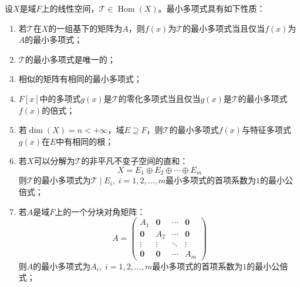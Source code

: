 \begin{property}\label{prop:MinimalPolynomial}
	设$X$是域$F$上的线性空间，$\mathcal{T}\in\operatorname{Hom}(X)$。最小多项式具有如下性质：
	\begin{enumerate}
		\item 若$\mathcal{T}$在$X$的一组基下的矩阵为$A$，则$f(x)$为$\mathcal{T}$的最小多项式当且仅当$f(x)$为$A$的最小多项式；
		\item $\mathcal{T}$的最小多项式是唯一的；
		\item 相似的矩阵有相同的最小多项式；
		\item $F[x]$中的多项式$g(x)$是$\mathcal{T}$的零化多项式当且仅当$g(x)$是$\mathcal{T}$的最小多项式$f(x)$的倍式；
		\item 若$\dim(X)=n<+\infty$，域$E\supseteq F$，则$\mathcal{T}$的最小多项式$f(x)$与特征多项式$g(x)$在$E$中有相同的根；
		\item 若$X$可以分解为$\mathcal{T}$的非平凡不变子空间的直和：
		\begin{equation*}
			X=E_1\oplus E_2\oplus\cdots\oplus E_m
		\end{equation*}
		则$\mathcal{T}$的最小多项式为$\mathcal{T}\mid E_i,\;i=1,2,\dots,m$最小多项式的首项系数为$1$的最小公倍式；
		\item 若$A$是域$F$上的一个分块对角矩阵：
		\begin{equation*}
			A=
			\begin{pmatrix}
				A_1 &\mathbf{0} & \cdots & \mathbf{0} \\
				\mathbf{0} & A_2 & \cdots & \mathbf{0} \\
				\vdots & \vdots & \ddots & \vdots \\
				\mathbf{0} & \mathbf{0} & \cdots & A_m
			\end{pmatrix} 
		\end{equation*}
		则$A$的最小多项式为$A_i,\;i=1,2,\dots,m$最小多项式的首项系数为$1$的最小公倍式；

\end{enumerate}
\end{property}

